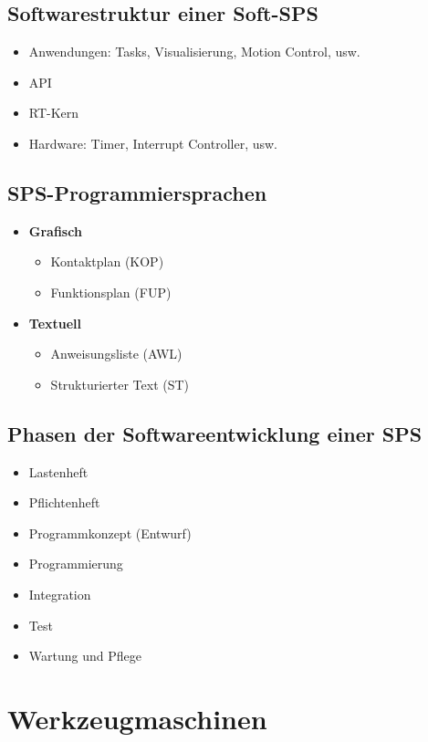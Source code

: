 \subsection{Softwarestruktur einer Soft-SPS}
\begin{itemize}
	\item Anwendungen: Tasks, Visualisierung, Motion Control, usw.
	\item API
	\item RT-Kern
	\item Hardware: Timer, Interrupt Controller, usw.
\end{itemize}


\subsection{SPS-Programmiersprachen}
\begin{itemize}
	\item \textbf{Grafisch}
	\begin{itemize}
		\item Kontaktplan (KOP)
		\item Funktionsplan (FUP)
	\end{itemize}
	\item \textbf{Textuell}
	\begin{itemize}
		\item Anweisungsliste (AWL)
		\item Strukturierter Text (ST)
	\end{itemize}
\end{itemize}


\subsection{Phasen der Softwareentwicklung einer SPS}
\begin{itemize}
	\item Lastenheft
	\item Pflichtenheft
	\item Programmkonzept (Entwurf)
	\item Programmierung
	\item Integration
	\item Test
	\item Wartung und Pflege
\end{itemize}



\section{Werkzeugmaschinen}


